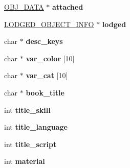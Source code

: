 \begin{DoxyCompactItemize}
\item 
\hypertarget{structobj__data_a834d9cc008c50fd20403d445369ed468}{\hyperlink{structobj__data}{O\-B\-J\-\_\-\-D\-A\-T\-A} $\ast$ {\bfseries attached}}\label{structobj__data_a834d9cc008c50fd20403d445369ed468}

\item 
\hypertarget{structobj__data_a10e523ad01f83e3078fa625ad07039c6}{\hyperlink{structlodged__object__info}{L\-O\-D\-G\-E\-D\-\_\-\-O\-B\-J\-E\-C\-T\-\_\-\-I\-N\-F\-O} $\ast$ {\bfseries lodged}}\label{structobj__data_a10e523ad01f83e3078fa625ad07039c6}

\item 
\hypertarget{structobj__data_aa7817e64d68c66b38ba1dc0831bf0c71}{char $\ast$ {\bfseries desc\-\_\-keys}}\label{structobj__data_aa7817e64d68c66b38ba1dc0831bf0c71}

\item 
\hypertarget{structobj__data_a0f8638bf5b66223b127e0a47255a46c4}{char $\ast$ {\bfseries var\-\_\-color} \mbox{[}10\mbox{]}}\label{structobj__data_a0f8638bf5b66223b127e0a47255a46c4}

\item 
\hypertarget{structobj__data_af352f52f9de8c72bb528025f4d042489}{char $\ast$ {\bfseries var\-\_\-cat} \mbox{[}10\mbox{]}}\label{structobj__data_af352f52f9de8c72bb528025f4d042489}

\item 
\hypertarget{structobj__data_a4e5beb47c4a93b6ba2dfb9c3c3e861ca}{char $\ast$ {\bfseries book\-\_\-title}}\label{structobj__data_a4e5beb47c4a93b6ba2dfb9c3c3e861ca}

\item 
\hypertarget{structobj__data_a4dc848be308304afffedba351882931a}{int {\bfseries title\-\_\-skill}}\label{structobj__data_a4dc848be308304afffedba351882931a}

\item 
\hypertarget{structobj__data_ac65eabe837bcfa12c4be45d2ec4b16c9}{int {\bfseries title\-\_\-language}}\label{structobj__data_ac65eabe837bcfa12c4be45d2ec4b16c9}

\item 
\hypertarget{structobj__data_ac2954fc02361dfdb6902e432f1b3ff2c}{int {\bfseries title\-\_\-script}}\label{structobj__data_ac2954fc02361dfdb6902e432f1b3ff2c}

\item 
\hypertarget{structobj__data_a2669831ef9c47c9b45362a85a6f180cd}{int {\bfseries material}}\label{structobj__data_a2669831ef9c47c9b45362a85a6f180cd}


\end{DoxyCompactItemize}
